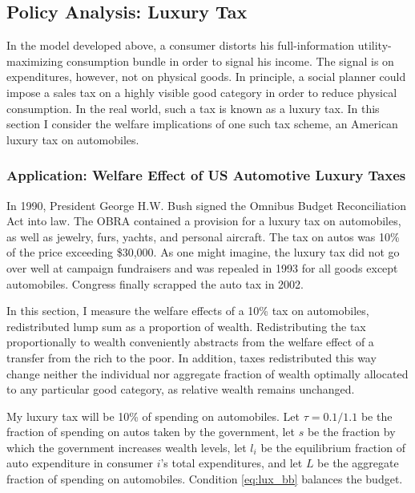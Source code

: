 \documentclass[11pt]{article}
\begin{document}
\begin{CJK}{UTF8}{gbsn}
\subsection{Policy Analysis: Luxury Tax}

In the model developed above, a consumer distorts his full-information utility-maximizing consumption bundle in order to signal his income.  The signal is on expenditures, however, not on physical goods.  In principle, a social planner could impose a sales tax on a highly visible good category in order to reduce physical consumption.  In the real world, such a tax is known as a luxury tax.  In this section I consider the welfare implications of one such tax scheme, an American luxury tax on automobiles.

\subsubsection{Application: Welfare Effect of US Automotive Luxury Taxes}

In 1990, President George H.W. Bush signed the Omnibus Budget Reconciliation Act into law.\footnotemark{}  The OBRA contained a provision for a luxury tax on automobiles, as well as jewelry, furs, yachts, and personal aircraft.  The tax on autos was 10\% of the price exceeding \$30,000.  As one might imagine, the luxury tax did not go over well at campaign fundraisers and was repealed in 1993 for all goods except automobiles.\footnotemark{}  Congress finally scrapped the auto tax in 2002.

In this section, I measure the welfare effects of a 10\% tax on automobiles, redistributed lump sum as a proportion of wealth.  Redistributing the tax proportionally to wealth conveniently abstracts from the welfare effect of a transfer from the rich to the poor.  In addition, taxes redistributed this way change neither the individual nor aggregate fraction of wealth optimally allocated to any particular good category, as relative wealth remains unchanged.

My luxury tax will be 10\% of spending on automobiles.  Let $\tau = 0.1 / 1.1$ be the fraction of spending on autos taken by the government, let $s$ be the fraction by which the government increases wealth levels, let $l_i$ be the equilibrium fraction of auto expenditure in consumer $i$'s total expenditures, and let $L$ be the aggregate fraction of spending on automobiles.  Condition \eqref{eq:lux_bb} balances the budget.


\end{CJK}
\end{document}
